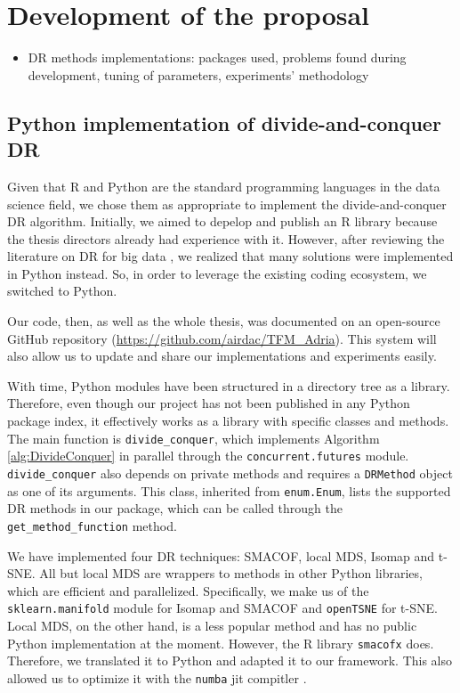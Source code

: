 \section{Development of the proposal}

\begin{itemize}
    \item DR methods implementations: packages used, problems found during development, tuning of parameters, experiments' methodology
\end{itemize}

\subsection{Python implementation of divide-and-conquer DR}

Given that R and Python are the standard programming languages in the data science field, we chose them as appropriate to implement the divide-and-conquer  DR algorithm. Initially, we aimed to depelop and publish an R library because the thesis directors already had experience with it. However, after reviewing the literature on DR for big data \citep{Reichmann2024}, we realized that many solutions were implemented in Python instead. So, in order to leverage the existing coding ecosystem, we switched to Python.

Our code, then, as well as the whole thesis, was documented on an open-source GitHub repository (\href{https://github.com/airdac/TFM_Adria}{https://github.com/airdac/TFM\_Adria}). This system will also allow us to update and share our implementations and experiments easily.

With time, Python modules have been structured in a directory tree as a library. Therefore, even though our project has not been published in any Python package index, it effectively works as a library with specific classes and methods. The main function is \verb|divide_conquer|, which implements Algorithm \ref{alg:DivideConquer} in parallel through the \verb|concurrent.futures| module. \verb|divide_conquer| also depends on private methods and requires a \verb|DRMethod| object as one of its arguments. This class, inherited from \verb|enum.Enum|, lists the supported DR methods in our package, which can be called through the \verb|get_method_function| method.

We have implemented four DR techniques: SMACOF, local MDS, Isomap and t-SNE. All but local MDS are wrappers to methods in other Python libraries, which are efficient and parallelized. Specifically, we make us of the \verb|sklearn.manifold| module \citep{Pedregosa2011} for Isomap and SMACOF and \verb|openTSNE| \citep{Poličar2023} for t-SNE. Local MDS, on the other hand, is a less popular method and has no public Python implementation at the moment. However, the R library \verb|smacofx| \citep{Leeuw2009} does. Therefore, we translated it to Python and adapted it to our framework. This also allowed us to optimize it with the \verb|numba| jit compitler \citep{Lam2015}.

